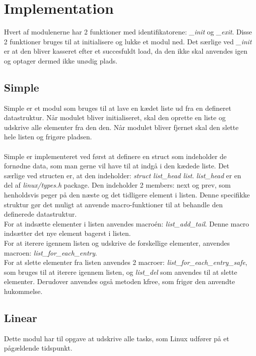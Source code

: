 \chapter{Implementation}
Hvert af modulenerne har 2 funktioner med identifikatorene: \textit{_init} og \textit{_exit}. Disse 2 funktioner bruges til at initialisere og lukke et modul ned. Det særlige ved \textit{_init} er at den bliver kasseret efter et succesfuldt load, da den ikke skal anvendes igen og optager dermed ikke unødig plads.\\
\section{Simple}
Simple er et modul som bruges til at lave en kædet liste ud fra en defineret datastruktur. Når modulet bliver initialiseret, skal den oprette en liste og udskrive alle elementer fra den den. Når modulet bliver fjernet skal den slette hele listen og frigøre pladsen.\\
\\
Simple er implementeret ved først at definere en struct som indeholder de fornødne data, som man gerne vil have til at indgå i den kædede liste. Det særlige ved structen er, at den indeholder: \textit{struct list\_head list}. \textit{list\_head} er en del af \textit{linux/types.h} package. Den indeholder 2 members: next og prev, som henholdsvis peger på den næste og det tidligere element i listen. Denne specifikke struktur gør det muligt at anvende macro-funktioner til at behandle den definerede datastruktur.\\

For at indsætte elementer i listen anvendes macroén: \textit{list\_add\_tail}. Denne macro indsætter det nye element bagerst i listen.\\

For at iterere igennem listen og udskrive de forskellige elementer, anvendes macroen: \textit{list\_for\_each\_entry}.\\

For at slette elementer fra listen anvendes 2 macroer: \textit{list\_for\_each\_entry\_safe}, som bruges til at iterere igennem listen, og \textit{list\_del} som anvendes til at slette elementer. Derudover anvendes også metoden kfree, som frigør den anvendte hukommelse.\\

\section{Linear}
Dette modul har til opgave at udskrive alle tasks, som Linux udfører på et pågældende tidspunkt. 

